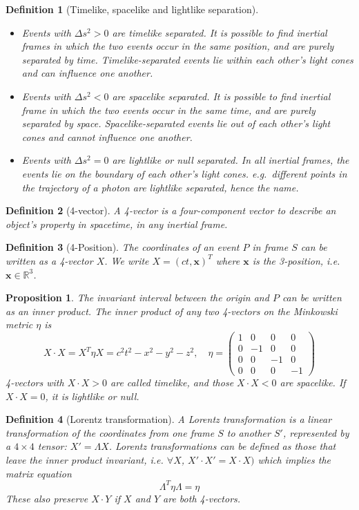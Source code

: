 \documentclass[a4paper]{article}
\newtheorem{defi}{Definition}[section]
\newtheorem{prop}{Proposition}[section]
\theoremstyle{new}
\begin{document}
\begin{defi}[Timelike, spacelike and lightlike separation]\leavevmode
\begin{itemize}
  \item Events with $\Delta s^2 > 0$ are timelike separated. It is possible to find inertial frames in which the two events occur in the same position, and are purely separated by time. Timelike-separated events lie within each other's light cones and can influence one another.
  \item Events with $\Delta s^2 < 0$ are spacelike separated. It is possible to find inertial frame in which the two events occur in the same time, and are purely separated by space. Spacelike-separated events lie out of each other's light cones and cannot influence one another.
  \item Events with $\Delta s^2 = 0$ are lightlike or null separated. In all inertial frames, the events lie on the boundary of each other's light cones. e.g.\ different points in the trajectory of a photon are lightlike separated, hence the name.
\end{itemize}
\end{defi}
\begin{defi}[4-vector]
  A 4-vector is a four-component vector to describe an object's property in spacetime, in any inertial frame.
\end{defi}
\begin{defi}[4-Position]
The coordinates of an event $P$ in frame $S$ can be written as a 4-vector $X$. We write $X=(ct,\mathbf{x})^T$ where $\mathbf{x}$ is the 3-position, i.e. $\mathbf{x}\in\mathbb{R}^3$.
\end{defi}
\begin{prop}
The invariant interval between the origin and $P$ can be written as an inner product. The inner product of any two 4-vectors on the Minkowski metric $\eta$ is
$$X\cdot X = X^T\eta X = c^2t^2 - x^2 - y^2 - z^2,\quad\eta =
  \begin{pmatrix}
    1 & 0 & 0 & 0\\
    0 & -1 & 0 & 0\\
    0 & 0 & -1 & 0\\
    0 & 0 & 0 & -1
  \end{pmatrix}$$
4-vectors with $X\cdot X > 0$ are called timelike, and those $X \cdot X < 0$ are spacelike. If $X\cdot X = 0$, it is lightlike or null.
\end{prop}
\begin{defi}[Lorentz transformation]
A Lorentz transformation is a linear transformation of the coordinates from one frame $S$ to another $S'$, represented by a $4\times 4$ tensor: $X' = \Lambda X$. Lorentz transformations can be defined as those that leave the inner product invariant, i.e. $\forall X$, $X'\cdot X' = X\cdot X)$ which implies the matrix equation
$$\Lambda^T\eta \Lambda = \eta$$
These also preserve $X\cdot Y$ if $X$ and $Y$ are both 4-vectors.
\end{defi}
\end{document}
